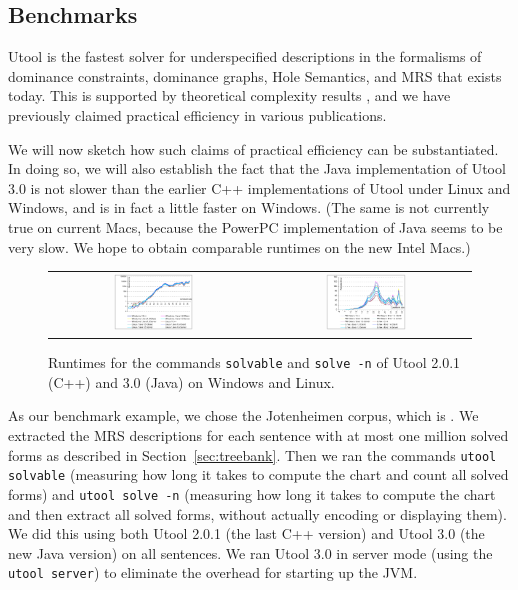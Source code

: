\subsection{Benchmarks}

Utool is the fastest solver for underspecified descriptions in the
formalisms of dominance constraints, dominance graphs, Hole Semantics,
and MRS that exists today. This is supported by theoretical complexity
results
\cite{Althaus-J.Algo.,bodirsky-weakly-normal-constraints,KolTha05b},
and we have previously claimed practical efficiency in various
publications.

We will now sketch how such claims of practical efficiency can be
substantiated. In doing so, we will also establish the fact that the
Java implementation of Utool 3.0 is not slower than the earlier C++
implementations of Utool under Linux and Windows, and is in fact a
little faster on Windows. (The same is not currently true on current
Macs, because the PowerPC implementation of Java seems to be very
slow. We hope to obtain comparable runtimes on the new Intel Macs.)

\begin{figure}
\begin{tabular}{cc}
\includegraphics[width=0.4\textwidth]{jh-extraction-mean}
&
\includegraphics[width=0.4\textwidth]{jh-chart-mean}
\end{tabular}
\caption{Runtimes for the commands \texttt{solvable} and \texttt{solve -n}
of Utool 2.0.1 (C++) and 3.0 (Java) on Windows and Linux. \label{fig:runtimes}}
\end{figure}

As our benchmark example, we chose the Jotenheimen corpus, which is
. We extracted the MRS
descriptions for each sentence with at most one million solved forms
as described in Section~\ref{sec:treebank}. Then we ran the commands
\verb?utool solvable? (measuring how long it takes to compute the
chart and count all solved forms) and \verb?utool solve -n? (measuring
how long it takes to compute the chart and then extract all solved
forms, without actually encoding or displaying them). We did this
using both Utool 2.0.1 (the last C++ version) and Utool 3.0 (the new
Java version) on all sentences. We ran Utool 3.0 in server mode (using
the \verb?utool server?) to eliminate the overhead for starting up the
JVM.

